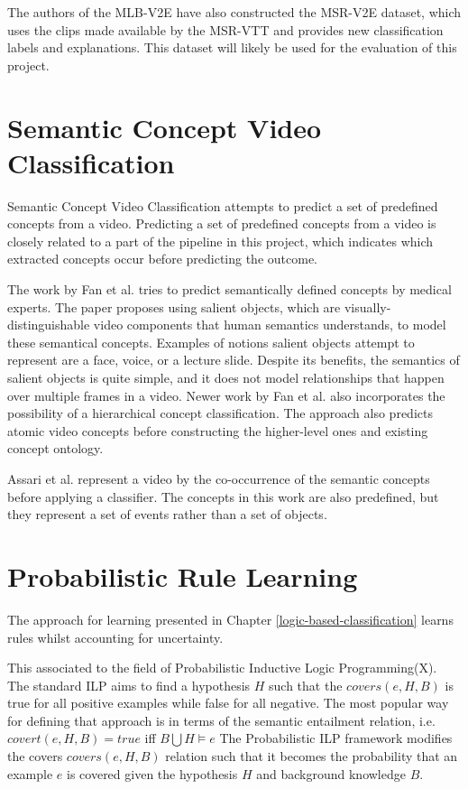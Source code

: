 The authors of the MLB-V2E \cite{RefWorks:RefID:16-2021automatic} have also constructed the MSR-V2E \cite{RefWorks:RefID:16-2021automatic} dataset, which uses the clips made available by the MSR-VTT and provides new classification labels and explanations.
This dataset will likely be used for the evaluation of this project.

\section{Semantic Concept Video Classification}

Semantic Concept Video Classification attempts to predict a set of predefined concepts from a video.
Predicting a set of predefined concepts from a video is closely related to a part of the pipeline in this project, which indicates which extracted concepts occur before predicting the outcome. 

The work by Fan et al. \cite{RefWorks:RefID:50-fan2004semantic} tries to predict semantically defined concepts by medical experts.
The paper proposes using salient objects, which are visually-distinguishable video components that human semantics understands, to model these semantical concepts.
Examples of notions salient objects attempt to represent are a face, voice, or a lecture slide.
Despite its benefits, the semantics of salient objects is quite simple, and it does not model relationships that happen over multiple frames in a video.
Newer work by Fan et al. \cite{RefWorks:RefID:51-jianping2007incorporating} also incorporates the possibility of a hierarchical concept classification. The approach also predicts atomic video concepts before constructing the higher-level ones and existing concept ontology.

Assari et al. \cite{RefWorks:RefID:52-assari2014video} represent a video by the co-occurrence of the semantic concepts before applying a classifier.
The concepts in this work are also predefined, but they represent a set of events rather than a set of objects.


\section{Probabilistic Rule Learning}

The approach for learning presented in Chapter \ref{logic-based-classification} learns rules whilst accounting for uncertainty.

This associated to the field of Probabilistic Inductive Logic Programming(X).
The standard ILP aims to find a hypothesis $H$ such that the $covers(e, H, B)$ is true for all positive examples while false for all negative.
The most popular way for defining that approach is in terms of the semantic entailment relation, i.e. $covert(e, H, B) = true$ iff $B \bigcup H \vDash e$
The Probabilistic ILP framework modifies the covers $covers(e, H, B)$ relation such that it becomes the probability that an example $e$ is covered given the hypothesis $H$ and background knowledge $B$.

